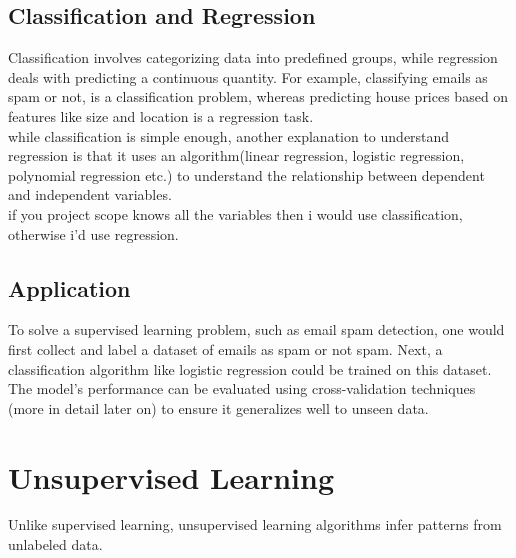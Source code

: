 \documentclass[11pt, a4paper]{article}
\begin{document}
\subsection{Classification and Regression}
Classification involves categorizing data into predefined groups, while regression deals with predicting a continuous quantity. For example, classifying emails as spam or not, is a classification problem, whereas predicting house prices based on features like size and location is a regression task.\\
while classification is simple enough, another explanation to understand regression is that it uses an algorithm(linear regression, logistic regression, polynomial regression etc.) to understand the relationship between dependent and independent variables.\\
if you project scope knows all the variables then i would use classification, otherwise i'd use regression.

\subsection{Application}
To solve a supervised learning problem, such as email spam detection, one would first collect and label a dataset of emails as spam or not spam. Next, a classification algorithm like logistic regression could be trained on this dataset. The model's performance can be evaluated using cross-validation techniques (more in detail later on) to ensure it generalizes well to unseen data.

\section{Unsupervised Learning}
Unlike supervised learning, unsupervised learning algorithms infer patterns from unlabeled data.
\end{document}
